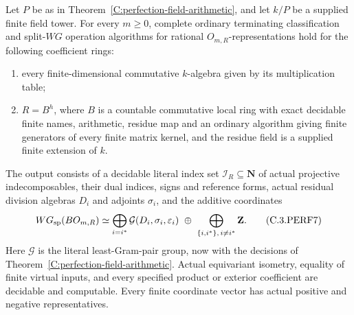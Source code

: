 \begin{theorem}
\label{C:perfection-coefficient-WG}
Let $P$ be as in Theorem~\ref{C:perfection-field-arithmetic}, and
let $k/P$ be a supplied finite field tower.  For every $m\ge0$,
complete ordinary terminating classification and split-$WG$
operation algorithms for rational $O_{m,R}$-representations hold
for the following coefficient rings:
\begin{enumerate}
\item every finite-dimensional commutative $k$-algebra given by
its multiplication table;
\item $R=B^h$, where $B$ is a countable commutative local ring
with exact decidable finite names, arithmetic, residue map and
an ordinary algorithm giving finite generators of every finite
matrix kernel, and the residue field is a supplied finite
extension of $k$.
\end{enumerate}
The output consists of a decidable literal index set
$\mathscr I_R\subseteq\mathbf N$ of actual projective
indecomposables, their dual indices, signs and reference forms,
actual residual division algebras $D_i$ and adjoints $\sigma_i$,
and the additive coordinates
\[
 WG_{\rm sp}(BO_{m,R})\simeq
 \bigoplus_{i=i^*}\mathcal G(D_i,\sigma_i,\varepsilon_i)
 \ \oplus\
 \bigoplus_{\{i,i^*\},\,i\ne i^*}\mathbf Z.             \tag{C.3.PERF7}
\]
Here $\mathcal G$ is the literal least-Gram-pair group, now with
the decisions of Theorem~\ref{C:perfection-field-arithmetic}.
Actual equivariant isometry, equality of finite virtual inputs,
and every specified product or exterior coefficient are decidable
and computable.  Every finite coordinate vector has actual positive
and negative representatives.
\end{theorem}
